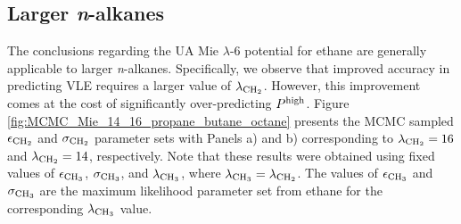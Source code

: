 \documentclass[preprint,letterpaper,floatfix,citeautoscript,aip,jcp]{revtex4-1}
\begin{document}

\subsection{Larger \textit{n}-alkanes} \label{Larger_nalkanes}


The conclusions regarding the UA Mie $\lambda$-6 potential for ethane are generally applicable to larger \textit{n}-alkanes. 
Specifically, we observe that improved accuracy in predicting VLE requires a larger value of $\lambda_{\rm CH_2}$. However, this improvement comes at the cost of significantly over-predicting $P^{\rm high}$. Figure \ref{fig:MCMC_Mie_14_16_propane_butane_octane} presents the MCMC sampled $\epsilon_{\rm CH_2}$ and $\sigma_{\rm CH_2}$ parameter sets with Panels a) and b) corresponding to $\lambda_{\rm CH_2} = 16$ and $\lambda_{\rm CH_2} = 14$, respectively. Note that these results were obtained using fixed values of $\epsilon_{\rm CH_3}$, $\sigma_{\rm CH_3}$, and $\lambda_{\rm CH_3}$, where $\lambda_{\rm CH_3} = \lambda_{\rm CH_2}$. The values of $\epsilon_{\rm CH_3}$ and $\sigma_{\rm CH_3}$ are the maximum likelihood parameter set from ethane for the corresponding $\lambda_{\rm CH_3}$ value.
\end{document}
